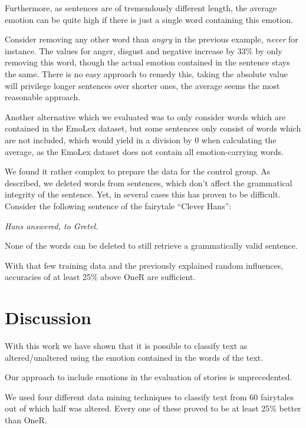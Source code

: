 \documentclass[letterpaper]{article}
\begin{document}
Furthermore, as sentences are of tremendously different length, the average emotion can be quite high if there is just a single word containing this emotion. 

Consider removing any other word than \textit{angry} in the previous example, \textit{never} for instance. The values for anger, disgust and negative increase by $33\%$ by only removing this word, though the actual emotion contained in the sentence stays the same. There is no easy approach to remedy this, taking the absolute value will privilege longer sentences over shorter ones, the average seems the most reasonable approach. 

Another alternative which we evaluated was to only consider words which are contained in the EmoLex dataset, but some sentences only consist of words which are not included, which would yield in a division by 0 when calculating the average, as the EmoLex dataset does not contain all emotion-carrying words. 

We found it rather complex to prepare the data for the control group. As described, we deleted words from sentences, which don't affect the grammatical integrity of the sentence. Yet, in several cases this has proven to be difficult. Consider the following sentence of the fairytale ``Clever Hans'': 

\textit{Hans answered, to Gretel.}

None of the words can be deleted to still retrieve a grammatically valid sentence. 

With that few training data and the previously explained random influences, accuracies of at least 25\% above OneR are sufficient. 

\section{Discussion}

With this work we have shown that it is possible to classify text as altered/unaltered using the emotion contained in the words of the text. 

Our approach to include emotions in the evaluation of stories is unprecedented. 

We used four different data mining techniques to classify text from 60 fairytales out of which half was altered. Every one of these proved to be at least 25\% better than OneR. 
\end{document}
